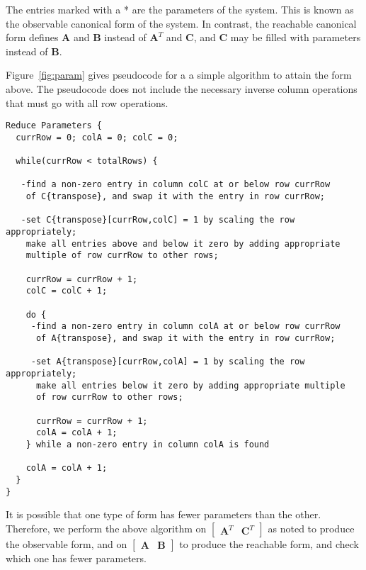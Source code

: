 The entries marked with a * are the parameters of the system.  This is
known as the observable canonical form of the system. In contrast, the
reachable canonical form defines $\mathbf{A}$ and $\mathbf{B}$ instead
of $\mathbf{A}^T$ and $\mathbf{C}$, and $\mathbf{C}$ may be filled
with parameters instead of $\mathbf{B}$.

Figure~\ref{fig:param} gives pseudocode for a a simple algorithm to
attain the form above.  The pseudocode does not include the necessary
inverse column operations that must go with all row operations.

\begin{figure*}[t]
\begin{verbatim}
Reduce Parameters {
  currRow = 0; colA = 0; colC = 0;

  while(currRow < totalRows) {

   -find a non-zero entry in column colC at or below row currRow 
    of C{transpose}, and swap it with the entry in row currRow;

   -set C{transpose}[currRow,colC] = 1 by scaling the row appropriately;
    make all entries above and below it zero by adding appropriate 
    multiple of row currRow to other rows;

    currRow = currRow + 1;
    colC = colC + 1;

    do {
     -find a non-zero entry in column colA at or below row currRow 
      of A{transpose}, and swap it with the entry in row currRow;

     -set A{transpose}[currRow,colA] = 1 by scaling the row appropriately;
      make all entries below it zero by adding appropriate multiple 
      of row currRow to other rows;

      currRow = currRow + 1;
      colA = colA + 1;
    } while a non-zero entry in column colA is found

    colA = colA + 1;
  }
}
\end{verbatim}
\vspace{-24pt}
\caption{Algorithm for parameter reduction. \protect\label{fig:param}}
\end{figure*}

    It is possible that one type of form has fewer parameters than the
other. Therefore, we perform the above algorithm on $\left [
\begin{array} {cc} \mathbf{A}^T & \mathbf{C}^T
\end{array} \right ]$ as noted to produce the observable form, and on $\left [
\begin{array} {cc} \mathbf{A} & \mathbf{B} \end{array} \right
]$ to produce the reachable form, and check which one has fewer
parameters.

